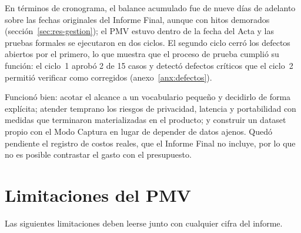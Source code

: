 En términos de cronograma, el balance acumulado fue de nueve días de adelanto sobre las fechas originales del Informe Final, aunque con hitos demorados (sección~\ref{sec:res-gestion}); el PMV estuvo dentro de la fecha del Acta y las pruebas formales se ejecutaron en dos ciclos. El segundo ciclo cerró los defectos abiertos por el primero, lo que muestra que el proceso de prueba cumplió su función: el ciclo~1 aprobó 2 de 15 casos y detectó defectos críticos que el ciclo~2 permitió verificar como corregidos (anexo~\ref{anx:defectos}).

Funcionó bien: acotar el alcance a un vocabulario pequeño y decidirlo de forma explícita; atender temprano los riesgos de privacidad, latencia y portabilidad con medidas que terminaron materializadas en el producto; y construir un dataset propio con el Modo Captura en lugar de depender de datos ajenos. Quedó pendiente el registro de costos reales, que el Informe Final no incluye, por lo que no es posible contrastar el gasto con el presupuesto.

\section{Limitaciones del PMV}\label{sec:concl-limitaciones}

Las siguientes limitaciones deben leerse junto con cualquier cifra del informe.


